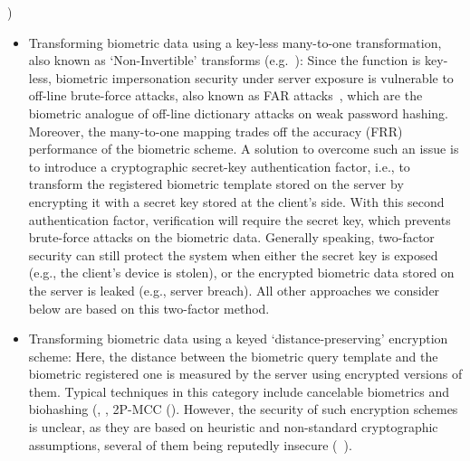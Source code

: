 \cite{jain2008biometric}) \begin{itemize} \item Transforming biometric data
  using a key-less many-to-one transformation, also known as `Non-Invertible'
  transforms (e.g.~\cite{ratha2007generating}): Since the function is key-less,
  biometric impersonation security under server exposure is vulnerable to
  off-line brute-force attacks, also known as FAR
  attacks~\cite{uludag2004attacks,roberts2007biometric}, which are the biometric
  analogue of off-line dictionary attacks on weak password hashing. Moreover,
  the many-to-one mapping trades off the accuracy (FRR) performance of
  the biometric scheme. A solution to overcome such an issue is to introduce a
  cryptographic secret-key authentication factor, i.e., to transform the
  registered biometric template stored on the server by encrypting it with a
  secret key stored at the client's side. With this second authentication
  factor, verification will require the secret key, which prevents brute-force
  attacks on the biometric data. Generally speaking, two-factor security can still protect the system when either the secret key is exposed (e.g., the client's device is
  stolen), or the encrypted biometric data stored on the server is leaked (e.g.,
  server breach). All other approaches we consider below are based on this
  two-factor method.


\item Transforming biometric data using a keyed `distance-preserving' encryption scheme:  Here, the distance between the biometric query template and the biometric registered one is measured by the server using encrypted versions of them.  Typical techniques in this category include
            cancelable biometrics and biohashing (\cite{teoh2008cancellable}, \cite{jin2004biohashing}, 2P-MCC (\cite{cappelli2010minutia}). %
However, the security of such encryption schemes is unclear, as they are based on heuristic and non-standard cryptographic assumptions, several of them being reputedly insecure (~\cite{lee2009inverse,lacharme2013preimage}).


\end{itemize}
